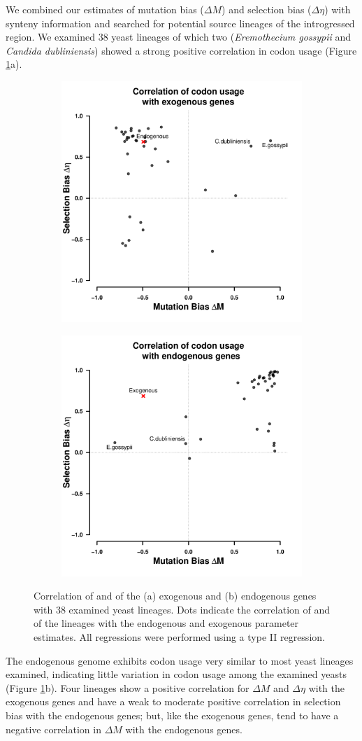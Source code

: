 \documentclass[12pt]{article}
\begin{document}
We combined our estimates of mutation bias ($\Delta M$) and selection bias ($\Delta \eta$) with synteny information and searched for potential source lineages of the introgressed region.
We examined 38 yeast lineages of which two (\textit{Eremothecium gossypii} and \textit{Candida dubliniensis}) showed a strong positive correlation in codon usage (Figure \ref{fig:csp_endo_exo_comp}a).
\begin{figure}[h]
    \centering
    \begin{subfigure}
        \centering
        \includegraphics[width=.45\textwidth]{img/csp_mean_correlation_exo.pdf}
    \end{subfigure}
    \begin{subfigure}
        \centering
        \includegraphics[width=.45\textwidth]{img/csp_mean_correlation_endo.pdf}
    \end{subfigure}
    \caption{Correlation of \DM and \DE of the (a) exogenous and (b) endogenous genes with 38 examined yeast lineages. Dots indicate the correlation of \DM and \DE of the lineages with the endogenous and exogenous parameter estimates. All regressions were performed using a type II regression.}
    \label{fig:csp_endo_exo_comp}
\end{figure}
The endogenous \kluyveri genome exhibits codon usage very similar to most yeast lineages examined, indicating little variation in codon usage among the examined yeasts (Figure \ref{fig:csp_endo_exo_comp}b).
Four lineages show a positive correlation for $\Delta M$ and $\Delta \eta$ with the exogenous genes and have a weak to moderate positive correlation in selection bias with the endogenous genes; but, like the exogenous genes, tend to have a negative correlation in $\Delta M$ with the endogenous genes.
\end{document}
